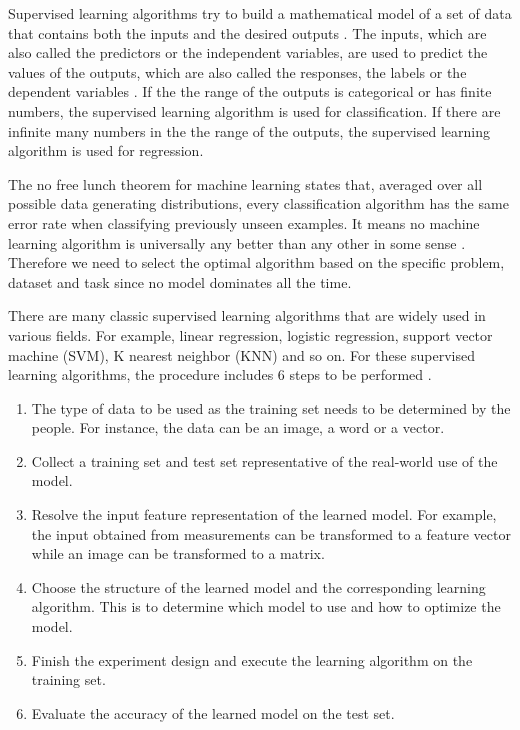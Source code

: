 \documentclass[
]{article}
\begin{document}
Supervised learning algorithms try to build a mathematical model of a
set of data that contains both the inputs and the desired outputs
\cite{russell2010artificial}. The inputs, which are also called the
predictors or the independent variables, are used to predict the values
of the outputs, which are also called the responses, the labels or the
dependent variables \cite{friedman2001elements}. If the the range of the
outputs is categorical or has finite numbers, the supervised learning
algorithm is used for classification. If there are infinite many numbers
in the the range of the outputs, the supervised learning algorithm is
used for regression.

The no free lunch theorem \cite{wolpert1996lack} for machine learning
states that, averaged over all possible data generating distributions,
every classification algorithm has the same error rate when classifying
previously unseen examples. It means no machine learning algorithm is
universally any better than any other in some sense
\cite{goodfellow2016deep}. Therefore we need to select the optimal
algorithm based on the specific problem, dataset and task since no model
dominates all the time.

There are many classic supervised learning algorithms that are widely
used in various fields. For example, linear regression, logistic
regression, support vector machine (SVM), K nearest neighbor (KNN) and
so on. For these supervised learning algorithms, the procedure includes
6 steps to be performed \cite{praveena2017literature}.

\begin{enumerate}
\item
  The type of data to be used as the training set needs to be determined
  by the people. For instance, the data can be an image, a word or a
  vector.
\item
  Collect a training set and test set representative of the real-world
  use of the model.
\item
  Resolve the input feature representation of the learned model. For
  example, the input obtained from measurements can be transformed to a
  feature vector while an image can be transformed to a matrix.
\item
  Choose the structure of the learned model and the corresponding
  learning algorithm. This is to determine which model to use and how to
  optimize the model.
\item
  Finish the experiment design and execute the learning algorithm on the
  training set.
\item
  Evaluate the accuracy of the learned model on the test set.
\end{enumerate}
\end{document}
